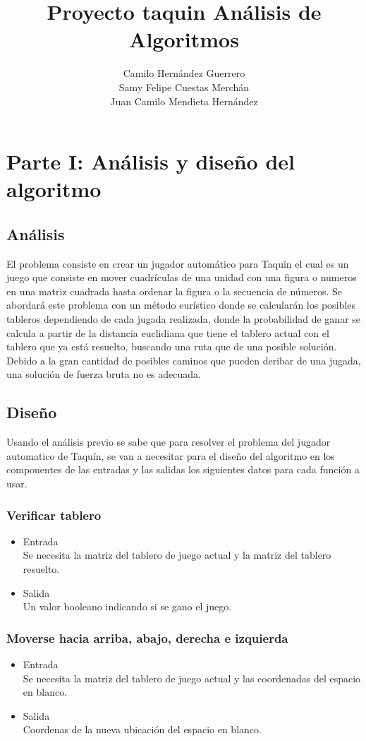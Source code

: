 \documentclass{article}
\title{Proyecto taquin Análisis de Algoritmos}
\author{Camilo Hernández Guerrero\\Samy Felipe Cuestas Merchán\\Juan Camilo Mendieta Hernández}
\begin{document}
\maketitle

\section{Parte I: Análisis y diseño del algoritmo}
\subsection{Análisis}
El problema consiste en crear un jugador automático para Taquín el cual es un juego que consiste en mover cuadrículas de una unidad con una figura o numeros en una matriz cuadrada hasta ordenar la figura o la secuencia de números.
Se abordará este problema con un método eurístico donde se calcularán los posibles tableros dependiendo de cada jugada realizada, donde la probabilidad de ganar se calcula a partir de la distancia euclidiana que tiene el tablero actual con el tablero que ya está resuelto, buscando una ruta que de una posible solución. Debido a la gran cantidad de posibles caminos que pueden deribar de una jugada, una solución de fuerza bruta no es adecuada.

\subsection{Diseño}
Usando el análisis previo se sabe que para resolver el problema del jugador automatico de Taquín, se van a necesitar para el diseño del algoritmo en los componentes de las entradas y las salidas los siguientes datos para cada función a usar.

\subsubsection{Verificar tablero}
\begin{itemize}
    \item Entrada
    \\Se necesita la matriz del tablero de juego actual y la matriz del tablero resuelto.
    \item Salida
    \\Un valor booleano indicando si se gano el juego.
\end{itemize}

\subsubsection{Moverse hacia arriba, abajo, derecha e izquierda}
\begin{itemize}
    \item Entrada
    \\Se necesita la matriz del tablero de juego actual y las coordenadas del espacio en blanco.
    \item Salida
    \\Coordenas de la nueva ubicación del espacio en blanco.
\end{itemize}
\end{document}
